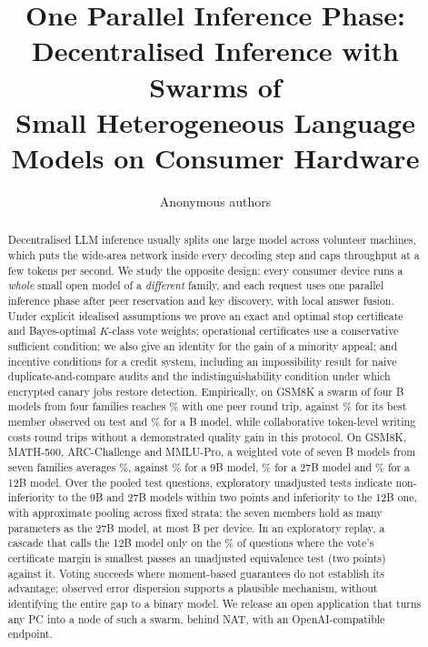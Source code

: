 \documentclass[11pt]{article}
\title{One Parallel Inference Phase:\\
Decentralised Inference with Swarms of\\
Small Heterogeneous Language Models on Consumer Hardware}
\author{Anonymous authors}
\date{}
\theoremstyle{definition}
\theoremstyle{remark}
\begin{document}
\maketitle

\begin{abstract}
Decentralised LLM inference usually splits one large model across volunteer machines, which puts the
wide-area network inside every decoding step and caps throughput at a few tokens per second. We study the
opposite design: every consumer device runs a \emph{whole} small open model of a \emph{different} family,
and each request uses one parallel inference phase after peer reservation and key discovery, with local
answer fusion. Under explicit idealised assumptions we prove an exact and optimal stop certificate and
Bayes-optimal $K$-class vote weights; operational certificates use a conservative sufficient condition;
we also give an identity for the gain of a minority appeal; and incentive conditions for a credit system, including an
impossibility result for naive duplicate-and-compare audits and the indistinguishability condition under
which encrypted canary jobs restore detection. Empirically, on GSM8K a swarm of four
\eTwoSwarmSize{}B models from four families reaches \eTwoVote\% with one peer round trip, against \eTwoBest\% for its
best member observed on test and \eTwoRef\% for a \eTwoRefSize{}B model, while collaborative token-level writing costs
\eTwoCroiseTrips{} round trips without a demonstrated quality gain in this protocol. On GSM8K, MATH-500, ARC-Challenge
and MMLU-Pro, a weighted vote of
seven \eFourSwarmSize{}B models from seven families averages \eFourMeanSwarm\%, against \eFourMeanQwenNine\% for
a 9B model, \eFourMeanQwenTwentySeven\% for a 27B model and \eFourMeanGemmaTwelve\% for a 12B model. Over the
pooled test questions, exploratory unadjusted tests indicate non-inferiority to the 9B and 27B models
within two points and inferiority to the 12B one, with approximate pooling across fixed strata; the seven members hold
as many parameters as the 27B model, at most \eFourLargestPeerParams{}B per
device. In an exploratory replay, a cascade that calls the 12B model only on the
\eFourCascGemmaTwelveMarTwentyCalls\% of questions where the vote's certificate margin is smallest passes an
unadjusted equivalence test (two points) against it. Voting succeeds where moment-based guarantees do not establish its
advantage; observed error dispersion supports a plausible mechanism, without identifying the entire gap to a binary
model. We
release an open application that turns any PC into a node of such a swarm, behind NAT, with an
OpenAI-compatible endpoint.
\end{abstract}
\end{document}
